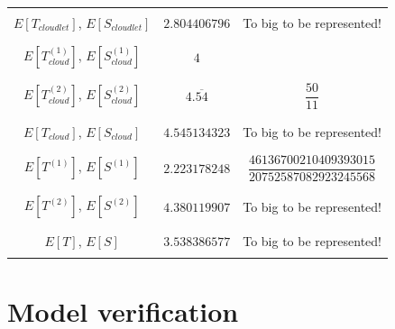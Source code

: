 \documentclass[10pt,a4paper]{article}
\begin{document}
\begin{table}[h!]
\begin{adjustbox}{center=\textwidth}
\begin{tabular}{c|c|c}
     &&\\\hline &&\\
	 
	 $E[T_{cloudlet}]$, $E[S_{cloudlet}]$ & $2.804406796$ & To big to be represented! \\     
              
     &&\\\hline &&\\
     
     $E[T^{(1)}_{cloud}]$, $E[S^{(1)}_{cloud}]$ & $4$ & \\
     
     &&\\\hline &&\\
     
     $E[T^{(2)}_{cloud}]$, $E[S^{(2)}_{cloud}]$ & $4.\overline{54}$ & $\dfrac{50}{11}$  \\
     
     &&\\\hline &&\\
     
     $E[T_{cloud}]$, $E[S_{cloud}]$ & $4.545134323$ & To big to be represented!  \\

	 &&\\\hline &&\\

	 $E[T^{(1)}]$, $E[S^{(1)}]$ & $2.223178248$ & $\dfrac{46136700210409393015}{20752587082923245568}$  \\

	 &&\\\hline &&\\

	 $E[T^{(2)}]$, $E[S^{(2)}]$ & $4.380119907$ & To big to be represented!  \\

	 &&\\\hline &&\\

	 $E[T]$, $E[S]$ & $3.538386577$ & To big to be represented!  \\
	 
	 &&\\

     \bottomrule

    \end{tabular}
    \end{adjustbox}
\end{table}

\clearpage
\newpage
\section{Model verification}
\end{document}
